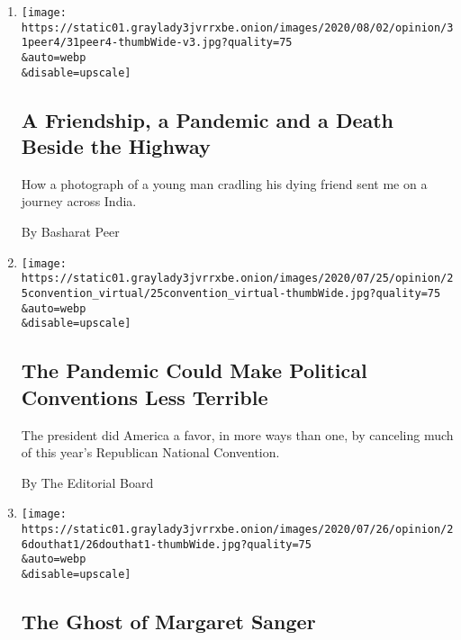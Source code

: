 \begin{enumerate}
\def\labelenumi{\arabic{enumi}.}
\item
  \href{/2020/07/31/opinion/sunday/India-migration-coronavirus.html}{}

  \texttt{[image: https://static01.graylady3jvrrxbe.onion/images/2020/08/02/opinion/31peer4/31peer4-thumbWide-v3.jpg?quality=75\\\&auto=webp\\\&disable=upscale]}

  \hypertarget{a-friendship-a-pandemic-and-a-death-beside-the-highway}{%
  \subsection{A Friendship, a Pandemic and a Death Beside the
  Highway}\label{a-friendship-a-pandemic-and-a-death-beside-the-highway}}

  How a photograph of a young man cradling his dying friend sent me on a
  journey across India.

  By Basharat Peer
\item
  \href{/2020/07/25/opinion/sunday/republican-convention-trump.html}{}

  \texttt{[image: https://static01.graylady3jvrrxbe.onion/images/2020/07/25/opinion/25convention\_virtual/25convention\_virtual-thumbWide.jpg?quality=75\\\&auto=webp\\\&disable=upscale]}

  \hypertarget{the-pandemic-could-make-political-conventions-less-terrible}{%
  \subsection{The Pandemic Could Make Political Conventions Less
  Terrible}\label{the-pandemic-could-make-political-conventions-less-terrible}}

  The president did America a favor, in more ways than one, by canceling
  much of this year's Republican National Convention.

  By The Editorial Board
\item
  \href{/2020/07/25/opinion/sunday/abortion-racism-margaret-sanger.html}{}

  \texttt{[image: https://static01.graylady3jvrrxbe.onion/images/2020/07/26/opinion/26douthat1/26douthat1-thumbWide.jpg?quality=75\\\&auto=webp\\\&disable=upscale]}

  \hypertarget{the-ghost-of-margaret-sanger}{%
  \subsection{The Ghost of Margaret
  Sanger}\label{the-ghost-of-margaret-sanger}}


\end{enumerate}
